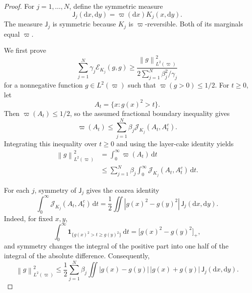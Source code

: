 \documentclass[11pt]{article}
\newcommand{\cE}{\mathcal E}
\newcommand{\norm}[1]{\left\lVert #1\right\rVert}
\newcommand{\abs}[1]{\left\lvert #1\right\rvert}
\newcommand{\1}{\mathbf 1}
\newcommand{\df}{\mathrm{d}}
\begin{document}
	\begin{proof}
		For \(j=1,\ldots,N\), define the symmetric measure
		\[
		\mathsf J_j(\df x,\df y)
		=
		\varpi(\df x)K_j(x,\df y).
		\]
		The measure \(\mathsf J_j\) is symmetric because \(K_j\) is
		\(\varpi\)-reversible.  Both of its marginals equal \(\varpi\).
		
		We first prove 
		\begin{equation} \label{eq:gap-fractional-pre}
			\sum_{j=1}^N
			\gamma_j\cE_{K_j}(g,g)
			\geq
			\frac{
				\norm{g}_{L^2(\varpi)}^2
			}{
				2\sum_{j=1}^N \beta_j^2/\gamma_j
			}
		\end{equation}
		for a nonnegative function \(g\in L^2(\varpi)\)
		such that
		$\varpi(g>0)\leq 1/2$.
		For \(t\geq0\), let
		\[
		A_t=\{x:g(x)^2>t\}.
		\]
		Then \(\varpi(A_t)\leq1/2\), so the assumed fractional boundary inequality
		gives
		\[
		\varpi(A_t)
		\leq
		\sum_{j=1}^N
		\beta_j \mathcal{J}_{K_j}(A_t,A_t^c).
		\]
		Integrating this inequality over \(t\geq0\) and using the layer-cake
		identity yields
		\[
		\begin{aligned}
			\norm{g}_{L^2(\varpi)}^2
			&=
			\int_0^\infty \varpi(A_t)\,\df t\\
			&\leq
			\sum_{j=1}^N
			\beta_j
			\int_0^\infty
			\mathcal{J}_{K_j}(A_t,A_t^c)\,\df t.
		\end{aligned}
		\]
		
		For each \(j\), symmetry of \(\mathsf J_j\) gives the coarea identity
		\[
		\int_0^\infty
		\mathcal{J}_{K_j}(A_t,A_t^c)\,\df t
		=
		\frac12
		\iint
		\abs{g(x)^2-g(y)^2}
		\,\mathsf J_j(\df x,\df y).
		\]
		Indeed, for fixed \(x,y\),
		\[
		\int_0^\infty
		\1_{\{g(x)^2>t\geq g(y)^2\}}\,\df t
		=
		\bigl[g(x)^2-g(y)^2\bigr]_+,
		\]
		and symmetry changes the integral of the positive part into one half
		of the integral of the absolute difference.  Consequently,
		\[
		\norm{g}_{L^2(\varpi)}^2
		\leq
		\frac12
		\sum_{j=1}^N
		\beta_j
		\iint
		\abs{g(x)-g(y)}\,\abs{g(x)+g(y)}
		\,\mathsf J_j(\df x,\df y).
		\]
		

\end{proof}
\end{document}

